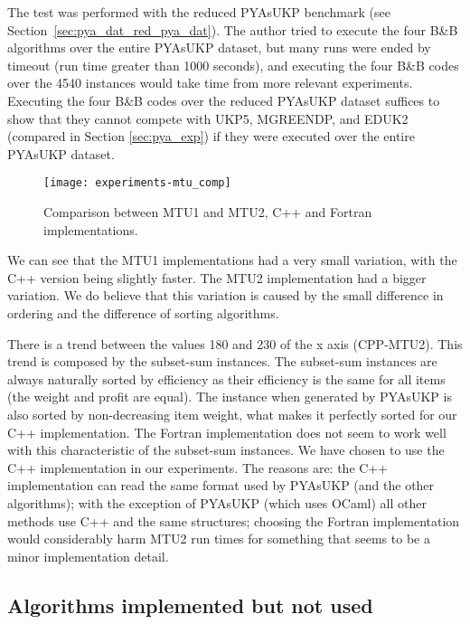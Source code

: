 The test was performed with the reduced PYAsUKP benchmark (see Section~\ref{sec:pya_dat_red_pya_dat}).
The author tried to execute the four B\&B algorithms over the entire PYAsUKP dataset, but many runs were ended by timeout (run time greater than 1000 seconds), and executing the four B\&B codes over the 4540 instances would take time from more relevant experiments.
Executing the four B\&B codes over the reduced PYAsUKP dataset suffices to show that they cannot compete with UKP5, MGREENDP, and EDUK2 (compared in Section \ref{sec:pya_exp}) if they were executed over the entire PYAsUKP dataset.

\vspace{0.25cm}
\begin{figure}[h]
\caption{Comparison between MTU1 and MTU2, C++ and Fortran implementations.}
\begin{center}
\texttt{[image: experiments-mtu\_comp]}
\end{center}
\label{fig:breq_bench}
\end{figure}

We can see that the MTU1 implementations had a very small variation, with the C++ version being slightly faster.
The MTU2 implementation had a bigger variation.
We do believe that this variation is caused by the small difference in ordering and the difference of sorting algorithms.

There is a trend between the values 180 and 230 of the x axis (CPP-MTU2).
This trend is composed by the subset-sum instances.
The subset-sum instances are always naturally sorted by efficiency as their efficiency is the same for all items (the weight and profit are equal).
The instance when generated by PYAsUKP is also sorted by non-decreasing item weight, what makes it perfectly sorted for our C++ implementation.
The Fortran implementation does not seem to work well with this characteristic of the subset-sum instances.
We have chosen to use the C++ implementation in our experiments.
The reasons are: the C++ implementation can read the same format used by PYAsUKP (and the other algorithms); with the exception of PYAsUKP (which uses OCaml) all other methods use C++ and the same structures; choosing the Fortran implementation would considerably harm MTU2 run times for something that seems to be a minor implementation detail.
\subsection{Algorithms implemented but not used}

